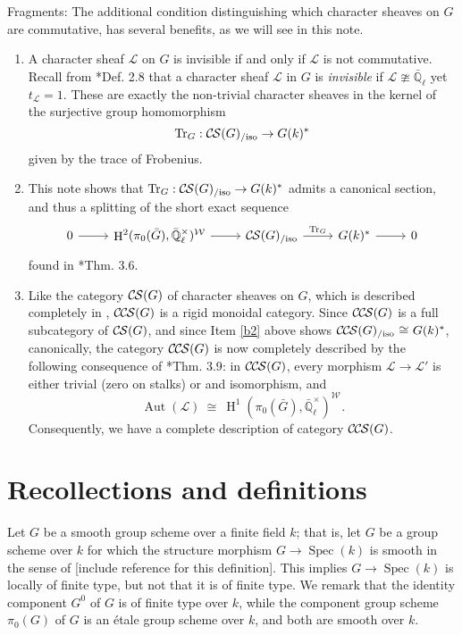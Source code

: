 \documentclass[10pt]{amsart}
\makeatletter
\theoremstyle{plain}
\theoremstyle{definition}
\newcommand{\EE}{\mathbb{\bar Q}_\ell}
\newcommand{\Fq}{k}
\newcommand{\EEx}{\EE^\times}
\newcommand{\Weil}[1]{\mathcal{W}_{#1}}
\DeclareMathOperator{\Aut}{Aut}
\DeclareMathOperator{\Hh}{H}
\newcommand{\Spec}[1]{{\operatorname{Spec}(#1)}}
\newcommand{\iso}{{\ \cong\ }}
\newcommand{\trFrob}[1]{t_{#1}}
\newcommand{\TrFrob}[1]{\operatorname{Tr}_{#1}}
\newcommand{\cs}[1]{{\mathcal{#1}}}
\newcommand{\CS}{{\mathcal{C\hskip-0.8pt S}}}
\newcommand{\CCS}{{\mathcal{C\hskip-.8pt C\hskip-0.8pt S}}}
\newcommand{\CSiso}[1]{\CS(#1)_{/\text{iso}}}
\newcommand{\CCSiso}[1]{\CCS(#1)_{/\text{iso}}}
\newcommand{\labitem}[2]{
\def\@itemlabel{\textbf{#1}}
\item
\def\@currentlabel{#1}\label{#2}}
\newcommand{\bG}{\bar{G}}
\makeatother
\begin{document}
Fragments: 
The additional condition distinguishing which character sheaves on $G$ are commutative, has several benefits, as we will see in this note.
\begin{enumerate}
\labitem{(1)}{b1}
A character sheaf $\cs{L}$ on $G$ is invisible if and only if $\cs{L}$ is not commutative.
Recall from \cite{cunningham-roe:13a}*{Def. 2.8} that a character sheaf $\cs{L}$ in $G$ is {\it invisible} if $\cs{L}  \ncong \EE$ yet $\trFrob{\cs{L}} =1$.
These are exactly the non-trivial character sheaves in the kernel of the surjective group homomorphism 
\[
\TrFrob{G} : \CSiso{G} \to G(\Fq)^*
\]
 given by the trace of Frobenius.
\labitem{(2)}{b2}
This note shows that $\TrFrob{G} : \CSiso{G} \to G(\Fq)^*$ admits a canonical section, and thus a splitting of the short exact sequence 
\[
\begin{tikzcd}
0 \arrow{r} & \Hh^2(\pi_0(\bG),\EEx)^{\Weil{}} \arrow{r} & \CSiso{G} \arrow{r}{\TrFrob{G}} & G(\Fq)^* \arrow{r} & 0
\end{tikzcd}
\]
found in \cite{cunningham-roe:13a}*{Thm. 3.6}.
\labitem{(3)}{b3}
Like the category $\CS(G)$ of character sheaves on $G$, which is described completely in \cite{cunningham-roe:13a}, $\CCS(G)$ is a rigid monoidal category.
Since $\CCS(G)$ is a full subcategory of $\CS(G)$, and since Item \ref{b2} above shows $\CCSiso{G} \iso G(\Fq)^*$, canonically, the category $\CCS(G)$ is now completely described by the following consequence of \cite{cunningham-roe:13a}*{Thm. 3.9}: in $\CCS(G)$, every morphism $\cs{L} \to \cs{L}'$ is either trivial (zero on stalks) or and isomorphism, and
\[
\Aut(\cs{L}) \iso  \Hh^1(\pi_0(\bG), \EEx)^{\Weil{}}.
\]
Consequently, we have a complete description of category $\CCS(G)$.
\end{enumerate}




\section{Recollections and definitions}

Let $G$ be a smooth group scheme over a finite field $\Fq$; that is, let $G$ be a group scheme over $\Fq$
for which the structure morphism $G \to \Spec{\Fq}$ is smooth in the sense of [include reference for this definition].
This implies $G \to \Spec{\Fq}$ is locally of finite type, but not that it is of finite type.
We remark that the identity component $G^0$ of $G$ is of finite type over $\Fq$, while the component group scheme
$\pi_0(G)$ of $G$ is an \'etale group scheme over $\Fq$, and both are smooth over $\Fq$.
\end{document}
